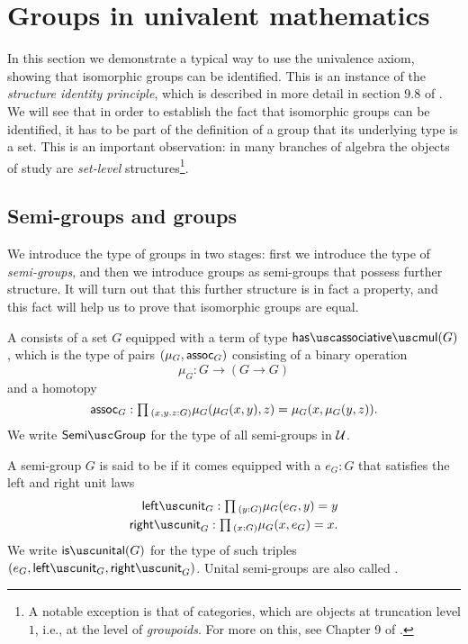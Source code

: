 \section{Groups in univalent mathematics}

In this section we demonstrate a typical way to use the univalence axiom, showing that isomorphic groups can be identified.
This is an instance of the \emph{structure identity principle}, which is described in more detail in section 9.8 of \cite{hottbook}.
We will see that in order to establish the fact that isomorphic groups can be identified, it has to be part of the definition of a group that its underlying type is a set. This is an important observation: in many branches of algebra the objects of study are \emph{set-level} structures\footnote{A notable exception is that of categories, which are objects at truncation level $1$, i.e., at the level of \emph{groupoids}. For more on this, see Chapter 9 of \cite{hottbook}.}.

\subsection{Semi-groups and groups}
We introduce the type of groups in two stages: first we introduce the type of \emph{semi-groups}, and then we introduce groups as semi-groups that possess further structure. It will turn out that this further structure is in fact a property, and this fact will help us to prove that isomorphic groups are equal.

\begin{defn}
  A  consists of a set $G$ equipped with a term of type $\hasassociativemul(G)$, which is the type of pairs $(\mu_G,\mathsf{assoc}_G)$ consisting of a binary operation
  \begin{equation*}
    \mu_G : G \to (G \to G)
  \end{equation*}
  and a homotopy
  \begin{equation*}
    \assoc_G : \prd{x,y.z:G}\mu_G(\mu_G(x,y),z)=\mu_G(x,\mu_G(y,z)).
  \end{equation*}
  We write $\semigroup$ for the type of all semi-groups in $\mathcal{U}$.
\end{defn}

\begin{defn}
  A semi-group $G$ is said to be  if it comes equipped with a  $e_G:G$ that satisfies the left and right unit laws
  \begin{align*}
    \leftunit_G : \prd{y:G}\mu_G(e_G,y)=y \\
    \rightunit_G : \prd{x:G}\mu_G(x,e_G)=x.
  \end{align*}
  We write $\isunital(G)$ for the type of such triples $(e_G,\leftunit_G,\rightunit_G)$. Unital semi-groups are also called .
\end{defn}

